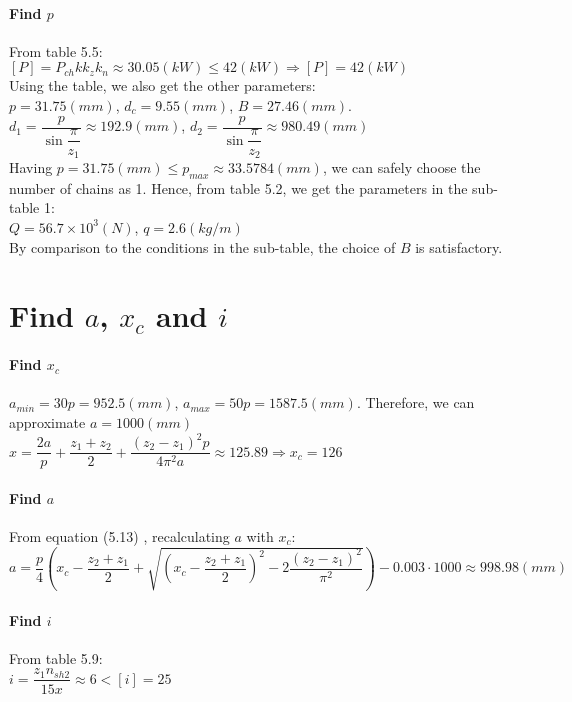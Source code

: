\paragraph{Find $ p $}
From table 5.5:\\
$ [P] = P_{ch}kk_zk_n \approx 30.05 \unit{(kW)} \leq 42 \unit{(kW)} \Rightarrow [P] = 42 \unit{(kW)}$\\
Using the table, we also get the other parameters:\\
$ p = 31.75 \unit{(mm)}$, $ d_c = 9.55 \unit{(mm)} $, $ B = 27.46 \unit{(mm)} $.\\
$ d_1=\dfrac{p}{\sin{\dfrac{\pi}{z_1}}} \approx 192.9 \unit{(mm)} $, 
$ d_2=\dfrac{p}{\sin{\dfrac{\pi}{z_2}}} \approx  980.49 \unit{(mm)}$\\
Having $ p = 31.75 \unit{(mm) \leq p_{max}} \approx 33.5784 \unit{(mm)} $, we can safely choose the number of chains as 1. Hence, from table 5.2, we get the parameters in the sub-table 1:\\
$ Q = 56.7\times10^3\unit{(N)} $, $ q = 2.6\unit{(kg/m)} $\\
By comparison to the conditions in the sub-table, the choice of $ B $ is satisfactory.

\section{Find $ a $, $ x_c $ and $ i $}

\paragraph{Find $ x_c $}
$ a_{min} = 30p = 952.5 \unit{(mm)} $, $ a_{max} = 50p = 1587.5 \unit{(mm)}$. Therefore, we can approximate $ a= 1000 \unit{(mm)} $\\
$ x = \dfrac{2a}{p} + \dfrac{z_1+z_2}{2} + \dfrac{(z_2-z_1)^2p}{4\pi^2a} \approx 125.89 \Rightarrow x_c = 126 $

\paragraph{Find $ a $}
From equation (5.13) , recalculating $ a $ with $ x_c $:\\
$ a = \dfrac{p}{4}\left(x_c-\dfrac{z_2+z_1}{2}+\sqrt{\left(x_c-\dfrac{z_2+z_1}{2}\right)^2-2\dfrac{(z_2-z_1)^2}{\pi^2}}\right) - 0.003\cdot1000\approx 998.98 \unit{(mm)}$

\paragraph{Find $ i $} From table 5.9:\\ $i=\dfrac{z_1n_{sh2}}{15x}\approx6<[i]=25 $


